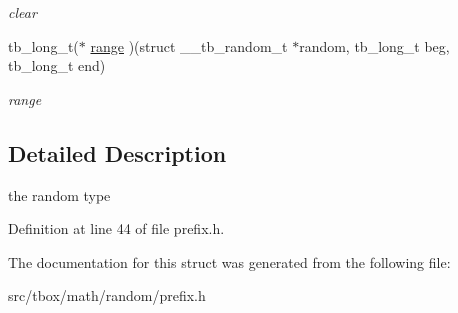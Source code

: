 \begin{DoxyCompactItemize}
\begin{DoxyCompactList}\small\item\em clear \end{DoxyCompactList}\item 
\hypertarget{structtb__random__t_a5a9e70cb6f99365d51797917002a4011}{tb\-\_\-long\-\_\-t($\ast$ \hyperlink{structtb__random__t_a5a9e70cb6f99365d51797917002a4011}{range} )(struct \-\_\-\-\_\-tb\-\_\-random\-\_\-t $\ast$random, tb\-\_\-long\-\_\-t beg, tb\-\_\-long\-\_\-t end)}\label{structtb__random__t_a5a9e70cb6f99365d51797917002a4011}

\begin{DoxyCompactList}\small\item\em range \end{DoxyCompactList}\end{DoxyCompactItemize}


\subsection{Detailed Description}
the random type 

Definition at line 44 of file prefix.\-h.



The documentation for this struct was generated from the following file\-:\begin{DoxyCompactItemize}
\item 
src/tbox/math/random/prefix.\-h\end{DoxyCompactItemize}
